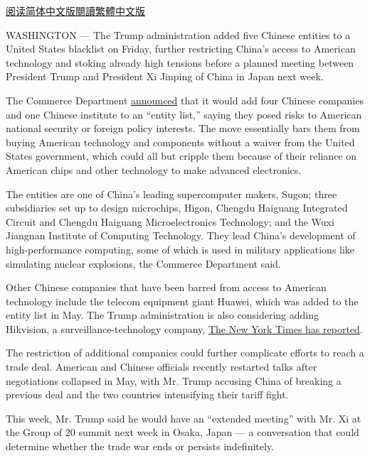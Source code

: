 \href{https://cn.nytimes.com/usa/20190624/us-china-trade-blacklist/}{阅读简体中文版}\href{https://cn.nytimes.com/usa/20190624/us-china-trade-blacklist/zh-hant/}{閱讀繁體中文版}

WASHINGTON --- The Trump administration added five Chinese entities to a
United States blacklist on Friday, further restricting China's access to
American technology and stoking already high tensions before a planned
meeting between President Trump and President Xi Jinping of China in
Japan next week.

The Commerce Department
\href{https://s3.amazonaws.com/public-inspection.federalregister.gov/2019-13245.pdf}{announced}
that it would add four Chinese companies and one Chinese institute to an
``entity list,'' saying they posed risks to American national security
or foreign policy interests. The move essentially bars them from buying
American technology and components without a waiver from the United
States government, which could all but cripple them because of their
reliance on American chips and other technology to make advanced
electronics.

The entities are one of China's leading supercomputer makers, Sugon;
three subsidiaries set up to design microchips, Higon, Chengdu Haiguang
Integrated Circuit and Chengdu Haiguang Microelectronics Technology; and
the Wuxi Jiangnan Institute of Computing Technology. They lead China's
development of high-performance computing, some of which is used in
military applications like simulating nuclear explosions, the Commerce
Department said.

Other Chinese companies that have been barred from access to American
technology include the telecom equipment giant Huawei, which was added
to the entity list in May. The Trump administration is also considering
adding Hikvision, a surveillance-technology company,
\href{https://www.nytimes.com/2019/05/21/us/politics/hikvision-trump.html}{The
New York Times has reported}.

The restriction of additional companies could further complicate efforts
to reach a trade deal. American and Chinese officials recently restarted
talks after negotiations collapsed in May, with Mr. Trump accusing China
of breaking a previous deal and the two countries intensifying their
tariff fight.

This week, Mr. Trump said he would have an ``extended meeting'' with Mr.
Xi at the Group of 20 summit next week in Osaka, Japan --- a
conversation that could determine whether the trade war ends or persists
indefinitely.

